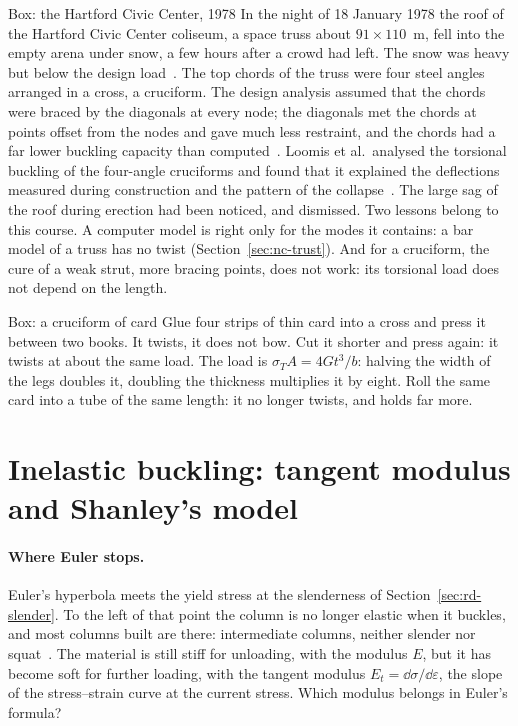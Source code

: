 \begin{gbox}{Box: the Hartford Civic Center, 1978}\label{sec:tw-hartford}
%
In the night of 18 January 1978 the roof of the Hartford Civic Center coliseum, a space truss about
$91\times110$~m, fell into the empty arena under snow, a few hours after a crowd had left. The snow
was heavy but below the design load~\cite{tw-martin2001}. The top chords of the truss were four steel
angles arranged in a cross, a cruciform. The design analysis assumed that the chords were braced by
the diagonals at every node; the diagonals met the chords at points offset from the nodes and gave
much less restraint, and the chords had a far lower buckling capacity than computed~\cite{tw-martin2001}.
Loomis et al.\ analysed the torsional buckling of the four-angle cruciforms and found that it explained
the deflections measured during construction and the pattern of the collapse~\cite{tw-loomis1980}.
The large sag of the roof during erection had been noticed, and dismissed.
Two lessons belong to this course. A computer model is right only for the modes it contains: a bar
model of a truss has no twist (Section~\ref{sec:nc-trust}). And for a cruciform, the cure of a weak
strut, more bracing points, does not work: its torsional load does not depend on the length.
\end{gbox}

\begin{gbox}{Box: a cruciform of card}\label{sec:tw-card}
%
Glue four strips of thin card into a cross and press it between two books. It twists, it does not
bow. Cut it shorter and press again: it twists at about the same load. The load is
$\sigma_TA = 4Gt^3/b$: halving the width of the legs doubles it, doubling the thickness multiplies it by
eight. Roll the same card into a tube of the same length: it no longer twists, and holds far more.
\end{gbox}

\section{Inelastic buckling: tangent modulus and Shanley's model}\label{sec:tw-shanley}
%

\paragraph{Where Euler stops.}
Euler's hyperbola meets the yield stress at the slenderness of
Section~\ref{sec:rd-slender}. To the left of that point the column is no longer elastic when it
buckles, and most columns built are there: intermediate columns, neither slender nor
squat~\cite[Section~13.5]{tw-hibbeler2014}. The material is still stiff for unloading, with
the modulus $E$, but it has become soft for further loading, with the tangent modulus
$E_t = \dd\sigma/\dd\varepsilon$, the slope of the stress--strain curve at the current stress. Which
modulus belongs in Euler's formula?

